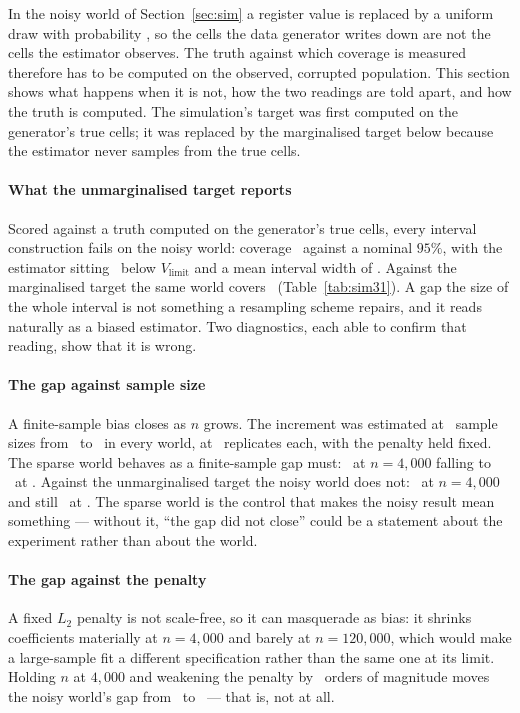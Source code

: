 
In the noisy world of Section~\ref{sec:sim} a register value is replaced by a
uniform draw with probability \simNoiseRate, so the cells the data generator
writes down are not the cells the estimator observes. The truth against which
coverage is measured therefore has to be computed on the observed, corrupted
population. This section shows what happens when it is not, how the two
readings are told apart, and how the truth is computed. The simulation's
target was first computed on the generator's true cells; it was replaced by
the marginalised target below because the estimator never samples from the
true cells.

\paragraph{What the unmarginalised target reports}
Scored against a truth computed on the generator's true cells, every interval
construction fails on the noisy world: coverage \coverageNoisyBefore\ against
a nominal $95\%$, with the estimator sitting \biasNoisyBefore\ below
$V_{\mathrm{limit}}$ and a mean interval width of \widthNoisyBefore. Against
the marginalised target the same world covers \coverageNoisyAfter\
(Table~\ref{tab:sim31}). A gap the size of the whole interval is not something
a resampling scheme repairs, and it reads naturally as a biased estimator. Two
diagnostics, each able to confirm that reading, show that it is wrong.

\paragraph{The gap against sample size}
A finite-sample bias closes as $n$ grows. The increment was estimated at
\nSizeGrid\ sample sizes from \sizeLo\ to \sizeHi\ in every world, at
\nScaleReps\ replicates each, with the penalty held fixed. The sparse world
behaves as a finite-sample gap must: \sparseGapSmall\ at $n = 4{,}000$ falling
to \sparseGapLarge\ at \sizeHi. Against the unmarginalised target the noisy
world does not: \noisyGapSmall\ at $n = 4{,}000$ and still \noisyGapLarge\ at
\sizeHi. The sparse world is the control that makes the noisy result mean
something --- without it, ``the gap did not close'' could be a statement about
the experiment rather than about the world.

\paragraph{The gap against the penalty}
A fixed $L_2$ penalty is not scale-free, so it can masquerade as bias: it
shrinks coefficients materially at $n = 4{,}000$ and barely at $n = 120{,}000$,
which would make a large-sample fit a different specification rather than the
same one at its limit. Holding $n$ at $4{,}000$ and weakening the penalty by
\nPenaltyDecades\ orders of magnitude moves the noisy world's gap from
\noisyGapTight\ to \noisyGapLoose\ --- that is, not at all.

